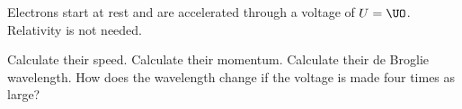 Electrons start at rest and are accelerated through a voltage of $U = \UO$. Relativity is not needed.

\begin{abcliste}
\abc Calculate their speed.
\abc Calculate their momentum.
\abc Calculate their de Broglie wavelength.
\abc How does the wavelength change if the voltage is made four times as large?
\end{abcliste}
